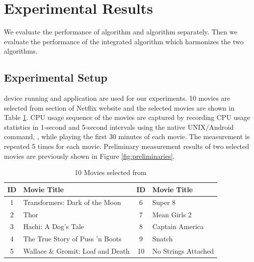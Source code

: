 \section{Experimental Results}
\label{sec:experiments}

We evaluate the performance of  algorithm and  algorithm separately.
Then we evaluate the performance of the integrated algorithm which harmonizes the two algorithms. 

\subsection{Experimental Setup}
\label{sec:experimental_setup}

 device running  and  application are used for our experiments. 
10 movies are selected from  section of Netflix website and the selected movies are shown in Table \ref{tab:movies}.
CPU usage sequence of the movies are captured by recording CPU usage statistics in 1-second and 5-second intervals using the native UNIX/Android command, , while playing the first 30 minutes of each movie. 
The measurement is repeated 5 times for each movie.
Preliminary measurement results of two selected movies are previously shown in Figure \ref{fig:preliminaries}.

\begin{table}[h!]
\begin{center}
\begin{tabular}{|c | m{5cm} ||c| m{5cm}|}
\hline
ID & Movie Title & ID & Movie Title \\ 
\hline
1 & Transformers: Dark of the Moon 		& 6 & Super 8\\
2 & Thor					& 7 & Mean Girls 2 \\
3 & Hachi: A Dog's Tale 			& 8 & Captain America \\
4 & The True Story of Puss 'n Boots 		& 9 &  Snatch \\
5 & Wallace \& Gromit: Loaf and Death 	& 10 & No Strings Attached \\
\hline
\end{tabular}
\end{center}
\caption{10 Movies selected from }
\label{tab:movies}
\end{table}

